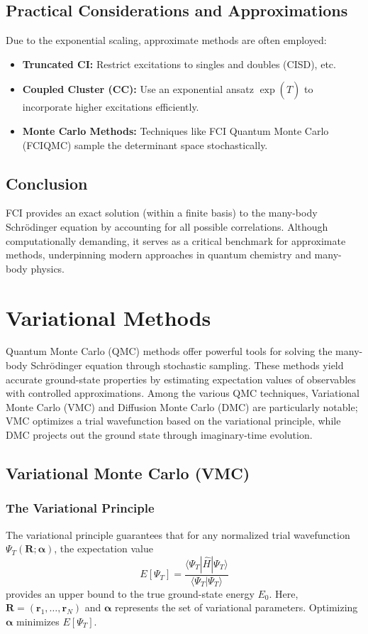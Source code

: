 \subsection{Practical Considerations and Approximations}
Due to the exponential scaling, approximate methods are often employed:
\begin{itemize}
    \item \textbf{Truncated CI:} Restrict excitations to singles and doubles (CISD), etc.
    \item \textbf{Coupled Cluster (CC):} Use an exponential ansatz $\exp(\hat{T})$ to incorporate higher excitations efficiently.
    \item \textbf{Monte Carlo Methods:} Techniques like FCI Quantum Monte Carlo (FCIQMC) sample the determinant space stochastically.
\end{itemize}

\subsection{Conclusion}
FCI provides an exact solution (within a finite basis) to the many-body Schrödinger equation by accounting for all possible correlations. Although computationally demanding, it serves as a critical benchmark for approximate methods, underpinning modern approaches in quantum chemistry and many-body physics.

\section{Variational Methods}

Quantum Monte Carlo (QMC) methods offer powerful tools for solving the many-body Schrödinger equation through stochastic sampling. These methods yield accurate ground-state properties by estimating expectation values of observables with controlled approximations. Among the various QMC techniques, Variational Monte Carlo (VMC) and Diffusion Monte Carlo (DMC) are particularly notable; VMC optimizes a trial wavefunction based on the variational principle, while DMC projects out the ground state through imaginary-time evolution.

\subsection{Variational Monte Carlo (VMC)}
\subsubsection{The Variational Principle}
The variational principle guarantees that for any normalized trial wavefunction $\Psi_T(\mathbf{R}; \boldsymbol{\alpha})$, the expectation value
\[
E[\Psi_T] = \frac{\langle \Psi_T | \hat{H} | \Psi_T \rangle}{\langle \Psi_T | \Psi_T \rangle}
\]
provides an upper bound to the true ground-state energy $E_0$. Here, $\mathbf{R} = (\mathbf{r}_1,\dots,\mathbf{r}_N)$ and $\boldsymbol{\alpha}$ represents the set of variational parameters. Optimizing $\boldsymbol{\alpha}$ minimizes $E[\Psi_T]$.

